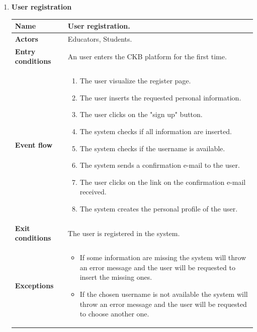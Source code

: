     \begin{enumerate}[label=\textbf{UC.\arabic*}]
        \item {} \textbf{User registration}
        \begin{table}[H]
    	    \centering
                \renewcommand{\arraystretch}{1.5}
                \begin{tabular}{|m{3.2cm}|m{9.8cm}|}
                    \hline
                    \textbf{Name} & User registration. \\
                    \hline
                    \textbf{Actors} & Educators, Students. \\
                    \hline
                    \textbf{Entry conditions}  & An user enters the CKB platform for the first time. \\
                    \hline
                    \textbf{Event flow}  & 
                    \begin{enumerate}[label=\arabic*.]
                        \item The user visualize the register page.
                        \item The user inserts the requested personal information.
                        \item The user clicks on the "sign up" button.
                        \item The system checks if all information are inserted.
                        \item The system checks if the username is available.
                        \item The system sends a confirmation e-mail to the user.
                        \item The user clicks on the link on the confirmation e-mail received.
                        \item The system creates the personal profile of the user.
                    \end{enumerate}\\
                    \hline
                    \textbf{Exit conditions}  & The user is registered in the system. \\
                    \hline
                    \textbf{Exceptions}  & 
                    \begin{itemize}
                        \item If some information are missing the system will throw an error message and the user will be requested to insert the missing ones.
                        \item If the chosen username is not available the system will throw an error message and the user will be requested to choose another one.

\end{itemize}
\end{tabular}
\end{table}
\end{enumerate}
